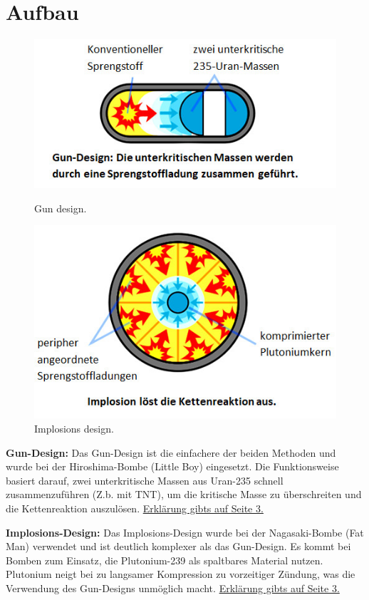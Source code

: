 \documentclass[a4paper,12pt]{article}
\begin{document}
\section{Aufbau}
\begin{figure}
    \vspace{-1cm}
    \includegraphics[scale=0.7]{Gun.png}
    \caption{Gun design.}
    \includegraphics[scale=0.7]{Implosion.png}
    \caption{Implosions design.}
\end{figure}

\textbf{Gun-Design:}
Das Gun-Design ist die einfachere der beiden Methoden und wurde bei der Hiroshima-Bombe (Little Boy) eingesetzt. Die Funktionsweise basiert darauf, 
zwei unterkritische Massen aus Uran-235 schnell zusammenzuführen (Z.b. mit TNT), um die kritische Masse zu überschreiten und die Kettenreaktion auszulösen. \hyperlink{gun_section}{Erklärung gibts auf Seite 3.}

\vspace*{2cm}

\noindent\textbf{Implosions-Design:}
Das Implosions-Design wurde bei der Nagasaki-Bombe (Fat Man) verwendet und ist deutlich komplexer als das Gun-Design. Es kommt bei Bomben zum Einsatz, die Plutonium-239 als spaltbares Material nutzen. 
Plutonium neigt bei zu langsamer Kompression zu vorzeitiger Zündung, was die Verwendung des Gun-Designs unmöglich macht. \hyperlink{implosion_section}{Erklärung gibts auf Seite 3.}
\end{document}

